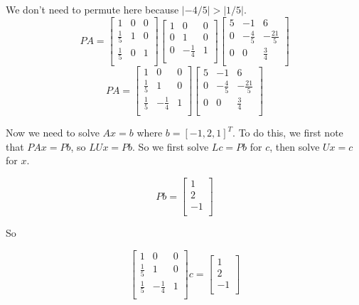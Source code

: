 \documentclass{article}
\begin{document}
We don't need to permute here because $|-4/5| > |1/5|$.
$$
P
A = 
\begin{bmatrix}
    1 & 0 & 0 \\
    \frac{1}{5} & 1 & 0 \\
    \frac{1}{5} & 0 & 1 \\
\end{bmatrix}
\begin{bmatrix}
    1 & 0 & 0 \\
    0 & 1 & 0 \\
    0 & -\frac{1}{4} & 1 \\
\end{bmatrix}
\begin{bmatrix}
  5  & -1 & 6 \\
    0 & -\frac{4}{5} & -\frac{21}{5} \\
    0  & 0 & \frac{3}{4} \\
\end{bmatrix}
  $$
  $$
  PA =
  \begin{bmatrix}
      1 & 0 & 0 \\
      \frac{1}{5} & 1 & 0 \\
      \frac{1}{5} & -\frac{1}{4} & 1 \\
  \end{bmatrix}
  \begin{bmatrix}
    5  & -1 & 6 \\
      0 & -\frac{4}{5} & -\frac{21}{5} \\
      0  & 0 & \frac{3}{4} \\
  \end{bmatrix}
    $$

Now we need to solve $Ax = b$ where $b = [-1, 2, 1]^T$.  To do this, we first note that $PAx = Pb$, so $LUx = Pb$.  So we first solve $Lc = Pb$ for $c$, then solve $Ux = c$ for $x$.

$$Pb = \begin{bmatrix}
    1  \\
    2  \\
    -1  \\
\end{bmatrix}$$

So 

$$ \begin{bmatrix}
    1 & 0 & 0 \\
    \frac{1}{5} & 1 & 0 \\
    \frac{1}{5} & -\frac{1}{4} & 1 \\
\end{bmatrix}c = \begin{bmatrix}
    1  \\
    2  \\
    -1  \\
\end{bmatrix}$$
\end{document}
